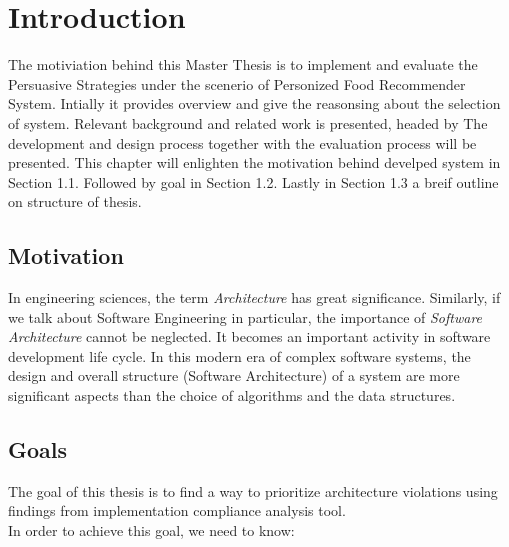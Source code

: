 \chapter{Introduction}
\setcounter{page}{1}%
\thispagestyle{empty}


The motiviation behind this Master Thesis is  to implement and evaluate the Persuasive Strategies under the scenerio of Personized Food Recommender System. Intially it provides overview and give the reasonsing about the selection of system. Relevant background and related work is presented, headed by The development and design process together with the evaluation process will be presented. \newline
This chapter will enlighten the motivation behind develped system in Section 1.1. Followed by goal in Section 1.2. Lastly  in Section 1.3 a breif outline on structure of thesis.

\section{Motivation}\label{motivation}
In engineering sciences, the term \textit{Architecture} has great significance. Similarly, if we talk about Software Engineering in particular, the importance of \textit{Software Architecture} cannot be neglected. It becomes an important activity in software development life cycle. In this modern era of complex software systems, the design and overall structure (Software Architecture) of a system are more significant aspects than the choice of algorithms and the data structures.\newline

\section{Goals}
The goal of this thesis is to find a way to prioritize architecture violations using findings from implementation compliance analysis tool. \\In order to achieve this goal, we need to know:

